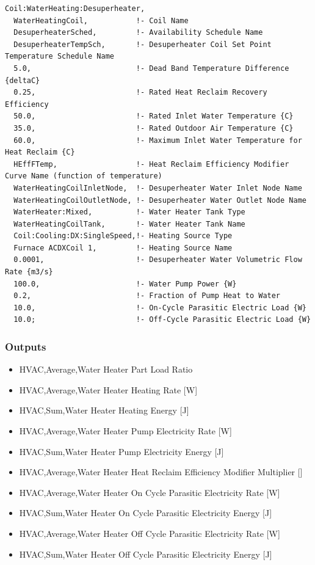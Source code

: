 \begin{lstlisting}
Coil:WaterHeating:Desuperheater,
  WaterHeatingCoil,           !- Coil Name
  DesuperheaterSched,         !- Availability Schedule Name
  DesuperheaterTempSch,       !- Desuperheater Coil Set Point Temperature Schedule Name
  5.0,                        !- Dead Band Temperature Difference {deltaC}
  0.25,                       !- Rated Heat Reclaim Recovery Efficiency
  50.0,                       !- Rated Inlet Water Temperature {C}
  35.0,                       !- Rated Outdoor Air Temperature {C}
  60.0,                       !- Maximum Inlet Water Temperature for Heat Reclaim {C}
  HEffFTemp,                  !- Heat Reclaim Efficiency Modifier Curve Name (function of temperature)
  WaterHeatingCoilInletNode,  !- Desuperheater Water Inlet Node Name
  WaterHeatingCoilOutletNode, !- Desuperheater Water Outlet Node Name
  WaterHeater:Mixed,          !- Water Heater Tank Type
  WaterHeatingCoilTank,       !- Water Heater Tank Name
  Coil:Cooling:DX:SingleSpeed,!- Heating Source Type
  Furnace ACDXCoil 1,         !- Heating Source Name
  0.0001,                     !- Desuperheater Water Volumetric Flow Rate {m3/s}
  100.0,                      !- Water Pump Power {W}
  0.2,                        !- Fraction of Pump Heat to Water
  10.0,                       !- On-Cycle Parasitic Electric Load {W}
  10.0;                       !- Off-Cycle Parasitic Electric Load {W}
\end{lstlisting}

\subsubsection{Outputs}\label{outputs-18}

\begin{itemize}
\item
  HVAC,Average,Water Heater Part Load Ratio
\item
  HVAC,Average,Water Heater Heating Rate {[}W{]}
\item
  HVAC,Sum,Water Heater Heating Energy {[}J{]}
\item
  HVAC,Average,Water Heater Pump Electricity Rate {[}W{]}
\item
  HVAC,Sum,Water Heater Pump Electricity Energy {[}J{]}
\item
  HVAC,Average,Water Heater Heat Reclaim Efficiency Modifier Multiplier {[]}
\item
  HVAC,Average,Water Heater On Cycle Parasitic Electricity Rate {[}W{]}
\item
  HVAC,Sum,Water Heater On Cycle Parasitic Electricity Energy {[}J{]}
\item
  HVAC,Average,Water Heater Off Cycle Parasitic Electricity Rate {[}W{]}
\item
  HVAC,Sum,Water Heater Off Cycle Parasitic Electricity Energy {[}J{]}
\end{itemize}

